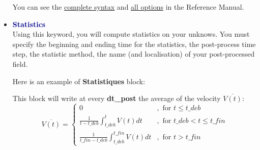 \begin{itemize}
You can see the \href{TRUST_Reference_Manual.pdf\#corpspostraitement}{complete syntax} and \href{TRUST_Reference_Manual.pdf\#champsposts}{all options} in the \trust Reference Manual.



\item \textcolor{darkblue}{\textbf{Statistics}}\\
Using this keyword, you will compute statistics on your unknows. You must specify the beginning and ending time for the statistics, the post-process time step, the statistic method, the name (and localisation) of your post-processed field.

Here is an example of \textbf{Statistiques} block:
    \begin{center}
    \end{center}


This block will write at every \textbf{dt\_post} the average of the velocity $\overline{V(t)}$:
\[
\overline{V(t)}=\left\{ \begin{array}{ll}
0 & ,\mbox{ for }t\leq t\mbox{\_}deb\\
\frac{1}{t-t\mbox{\_}deb}{\displaystyle \int_{t\mbox{\_}deb}^{t}V(t)dt} & ,\mbox{ for }t\mbox{\_}deb<t\leq t\mbox{\_}fin\\
\frac{1}{t\mbox{\_}fin-t\mbox{\_}deb}{\displaystyle \int_{t\mbox{\_}deb}^{t\mbox{\_}fin}V(t)dt} & ,\mbox{ for }t>t\mbox{\_}fin
\end{array}\right.
\]


\end{itemize}
